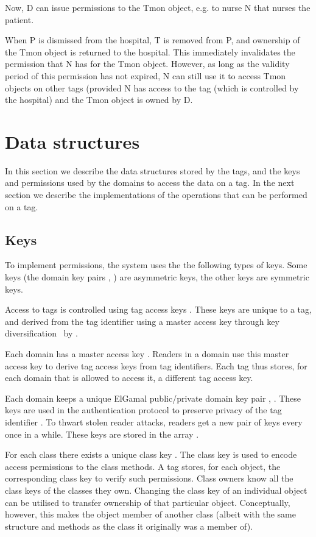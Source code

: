 Now, D can issue permissions to the Tmon object, e.g. to nurse N that nurses
the patient. 


When P is dismissed from the hospital, T is removed from P, and ownership of
the Tmon object is returned to the hospital. This immediately invalidates the
permission that N has for the Tmon object. However, as long as the validity
period of this permission has not expired, N can still use it to access Tmon
objects on other tags (provided N has access to the tag (which is controlled by
the hospital) and the Tmon object is owned by D. 

\section{Data structures}
\label{sec-datastruct}

In this section we describe the data structures stored by the tags, and the keys
and permissions used by the domains to access the data on a tag. In the next
section we describe the implementations of the operations that can be performed
on a tag.

\subsection{Keys}

To implement permissions, the system uses the 
the following types of keys. Some keys (the domain key pairs
, ) are asymmetric keys, the other keys are symmetric keys.
\begin{description}
\fixlistspacing
\item[Tag access keys .] 
  Access to tags is controlled using tag access keys . These keys are
  unique to a tag, and derived from the tag identifier  using a master
  access key  through key diversification~\cite{AndB96}
  by .
\item[Master access keys .]
  Each domain has a master access key .
  Readers in a domain use this master access key  to derive tag access 
  keys from tag identifiers. Each tag thus stores, for each domain that is
  allowed to access it, a different tag access key. 
\item[Domain key pairs , .] 
  Each domain keeps a unique ElGamal public/pri\-vate domain key pair ,
  . 
  These keys are used in the
  authentication protocol to preserve privacy of the tag identifier .
  To thwart stolen reader attacks, readers get a new pair of keys every
  once in a while. These keys are stored in the array .
\item[Class keys .] 
  For each class there exists a unique class key .
  The class key is used to encode access permissions to the class methods.
  A tag stores, for each object, the corresponding class key
  to verify such permissions.
  Class owners know all the class keys of the classes they own.
  Changing the class key of an individual object can be utilised to transfer
  ownership of that particular object. Conceptually, however, this makes the
  object member of another class (albeit with the same structure and methods
  as the class it originally was a member of).
\end{description}

